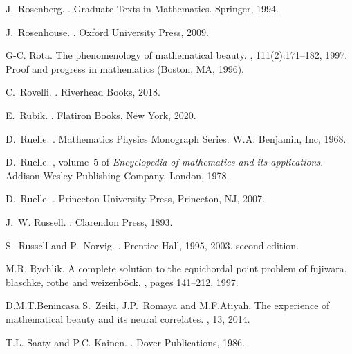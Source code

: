 \documentclass[12pt]{amsart}
\begin{document}
\begin{thebibliography}{100}
J.~Rosenberg.
.
\newblock Graduate Texts in Mathematics. Springer, 1994.

J.~Rosenhouse.
.
\newblock Oxford University Press, 2009.

G-C. Rota.
\newblock The phenomenology of mathematical beauty.
, 111(2):171--182, 1997.
\newblock Proof and progress in mathematics (Boston, MA, 1996).

C.~Rovelli.
.
\newblock Riverhead Books, 2018.

E.~Rubik.
.
\newblock Flatiron Books, New York, 2020.

D.~Ruelle.
.
\newblock Mathematics Physics Monograph Series. W.A. Benjamin, Inc, 1968.

D.~Ruelle.
, volume~5 of {\em Encyclopedia
  of mathematics and its applications}.
\newblock Addison-Wesley Publishing Company, London, 1978.

D.~Ruelle.
.
\newblock Princeton University Press, Princeton, NJ, 2007.

J.~W. Russell.
.
\newblock Clarendon Press, 1893.

S.~Russell and P.~Norvig.
.
\newblock Prentice Hall, 1995, 2003.
\newblock second edition.

M.R. Rychlik.
\newblock A complete solution to the equichordal point problem of fujiwara,
  blaschke, rothe and weizenb{\"o}ck.
, pages 141--212, 1997.

D.M.T.Benincasa S.~Zeiki, J.P.~Romaya and M.F.Atiyah.
\newblock The experience of mathematical beauty and its neural correlates.
, 13, 2014.

T.L. Saaty and P.C. Kainen.
.
\newblock Dover Publications, 1986.


\end{thebibliography}
\end{document}
